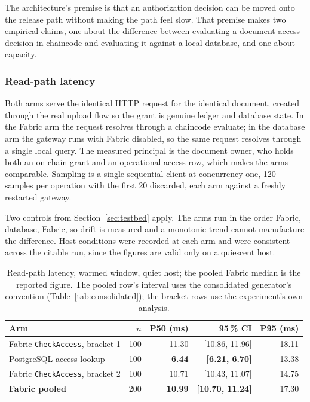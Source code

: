 \documentclass[preprint,12pt]{elsarticle}
\begin{document}
The architecture's premise is that an authorization decision can be moved onto
the release path without making the path feel slow. That premise makes two
empirical claims, one about the difference between evaluating a document
access decision in chaincode and evaluating it against a local database, and
one about capacity.

\subsubsection{Read-path latency}
\label{sec:exp_latency}

Both arms serve the identical HTTP request for the identical document, created
through the real upload flow so the grant is genuine ledger and database state.
In the Fabric arm the request resolves through a chaincode evaluate; in the
database arm the gateway runs with Fabric disabled, so the same request resolves
through a single local query. The measured principal is the document owner, who
holds both an on-chain grant and an operational access row, which makes the
arms comparable. Sampling is a single sequential
client at concurrency one, 120 samples per operation with the first 20 discarded,
each arm against a freshly restarted gateway.

Two controls from Section~\ref{sec:testbed} apply. The arms run in the order
Fabric, database, Fabric, so drift is measured and a monotonic trend cannot
manufacture the difference. Host conditions were recorded at each arm and were
consistent across the citable run, since the figures are valid only on a
quiescent host.

\begin{table}[!t]
\centering
\caption{Read-path latency, warmed window, quiet host; the pooled Fabric
median is the reported figure. The pooled row's interval uses the
consolidated generator's convention (Table~\ref{tab:consolidated}); the
bracket rows use the experiment's own analysis.}
\label{tab:readpath}
\footnotesize
\setlength{\tabcolsep}{5pt}
\begin{tabular}{@{}lrrrr@{}}
\toprule
Arm & $n$ & P50 (ms) & 95\,\% CI & P95 (ms) \\
\midrule
Fabric \texttt{CheckAccess}, bracket 1 & 100 & 11.30 & [10.86, 11.96] & 18.11 \\
PostgreSQL access lookup               & 100 & \textbf{6.44}  & \textbf{[6.21, 6.70]}   & 13.38 \\
Fabric \texttt{CheckAccess}, bracket 2 & 100 & 10.71 & [10.43, 11.07] & 14.75 \\
\midrule
\textbf{Fabric pooled}                 & 200 & \textbf{10.99} & \textbf{[10.70, 11.24]} & 17.30 \\
\bottomrule
\end{tabular}
\end{table}
\end{document}
